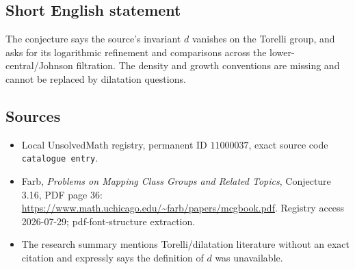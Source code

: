 \documentclass[11pt]{article}
\begin{document}
\subsection{Short English statement}
The conjecture says the source's invariant \(d\) vanishes on the Torelli group, and asks for its logarithmic refinement and comparisons across the lower-central/Johnson filtration. The density and growth conventions are missing and cannot be replaced by dilatation questions.
\subsection{Sources}
\begin{itemize}
\item Local UnsolvedMath registry, permanent ID \(11000037\), exact source code \texttt{catalogue entry}.
\item Farb, \emph{Problems on Mapping Class Groups and Related Topics}, Conjecture 3.16, PDF page 36: \url{https://www.math.uchicago.edu/~farb/papers/mcgbook.pdf}. Registry access 2026-07-29; pdf-font-structure extraction.
\item The research summary mentions Torelli/dilatation literature without an exact citation and expressly says the definition of \(d\) was unavailable.
\end{itemize}
\end{document}
